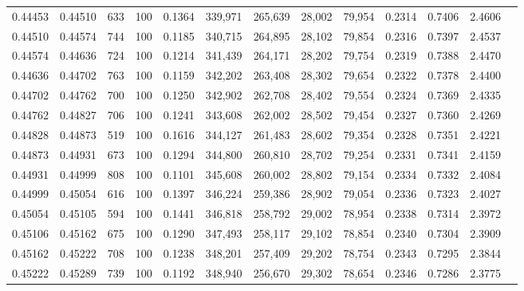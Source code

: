 \begin{tabular}{rrrrrrrrrrrrr}
0.44453 & 0.44510 &   633 & 100 &                                     0.1364 & 339,971 & 265,639 &  28,002 &  79,954 & 0.2314 & 0.7406 & 2.4606 \\
0.44510 & 0.44574 &   744 & 100 &                                     0.1185 & 340,715 & 264,895 &  28,102 &  79,854 & 0.2316 & 0.7397 & 2.4537 \\
0.44574 & 0.44636 &   724 & 100 &                                     0.1214 & 341,439 & 264,171 &  28,202 &  79,754 & 0.2319 & 0.7388 & 2.4470 \\
0.44636 & 0.44702 &   763 & 100 &                                     0.1159 & 342,202 & 263,408 &  28,302 &  79,654 & 0.2322 & 0.7378 & 2.4400 \\
0.44702 & 0.44762 &   700 & 100 &                                     0.1250 & 342,902 & 262,708 &  28,402 &  79,554 & 0.2324 & 0.7369 & 2.4335 \\
0.44762 & 0.44827 &   706 & 100 &                                     0.1241 & 343,608 & 262,002 &  28,502 &  79,454 & 0.2327 & 0.7360 & 2.4269 \\
0.44828 & 0.44873 &   519 & 100 &                                     0.1616 & 344,127 & 261,483 &  28,602 &  79,354 & 0.2328 & 0.7351 & 2.4221 \\
0.44873 & 0.44931 &   673 & 100 &                                     0.1294 & 344,800 & 260,810 &  28,702 &  79,254 & 0.2331 & 0.7341 & 2.4159 \\
0.44931 & 0.44999 &   808 & 100 &                                     0.1101 & 345,608 & 260,002 &  28,802 &  79,154 & 0.2334 & 0.7332 & 2.4084 \\
0.44999 & 0.45054 &   616 & 100 &                                     0.1397 & 346,224 & 259,386 &  28,902 &  79,054 & 0.2336 & 0.7323 & 2.4027 \\
0.45054 & 0.45105 &   594 & 100 &                                     0.1441 & 346,818 & 258,792 &  29,002 &  78,954 & 0.2338 & 0.7314 & 2.3972 \\
0.45106 & 0.45162 &   675 & 100 &                                     0.1290 & 347,493 & 258,117 &  29,102 &  78,854 & 0.2340 & 0.7304 & 2.3909 \\
0.45162 & 0.45222 &   708 & 100 &                                     0.1238 & 348,201 & 257,409 &  29,202 &  78,754 & 0.2343 & 0.7295 & 2.3844 \\
0.45222 & 0.45289 &   739 & 100 &                                     0.1192 & 348,940 & 256,670 &  29,302 &  78,654 & 0.2346 & 0.7286 & 2.3775 \\

\end{tabular}

